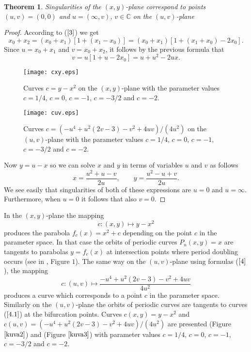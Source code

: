 \documentclass[12pt,a4paper]{amsart}
\newtheorem{lause}{Theorem}
\numberwithin{equation}{section}
\numberwithin{lause}{section}
\begin{document}
\begin{lause} \label{lause1.2}
Singularities of the $(x,y)$-plane correspond to points  $(u,v)=(0,0)$ and $u=(\infty,v)$, $v \in \mathbb{C}$ on the $(u,v)$-plane
\end{lause}
\begin{proof}
According to
($\ref{3}$) we get
\begin{displaymath}
x_{0}+x_{2}=(x_{0}+x_{1})[1+(x_{1}-x_{0})]=(x_{0}+x_{1})[1+(x_{1}+x_{0})-2x_{0}].
\end{displaymath}
Since $u=x_{0}+x_{1}$ and $v=x_{0}+x_{2}$, it follows by the previous formula that
\begin{displaymath}
v=u[1+u-2x_{0}]=u+u^{2}-2ux.
\end{displaymath}
\clearpage
\begin{figure}[h!]
\begin{center}
\texttt{[image: cxy.eps]}
\caption{Curves $c=y-x^{2}$ on the $(x,y)$-plane with the parameter values $c=1/4$, $c=0$, $c=-1$, $c=-3/2$ and $c=-2$.} \label{kuva2}
\end{center}
\end{figure}
\begin{figure}[h!]
\begin{center}
\texttt{[image: cuv.eps]}
\caption{Curves $c=(-u^{4}+u^{2}(2v-3)-v^{2}+4uv)/(4u^{2})$ on the $(u,v)$-plane with the parameter values $c=1/4$, $c=0$, $c=-1$, $c=-3/2$ and $c=-2$.} \label{kuva3}
\end{center}
\end{figure}
\clearpage
Now $y=u-x$ so we can solve $x$ and $y$ in terms of variables $u$
and $v$ as follows
\begin{equation}
 x=\frac{u^{2}+u-v}{2u},\qquad y=\frac{u^{2}-u+v}{2u}.\label{4}
 \end{equation}
 We see easily that singularities of both of these expressions are $u=0$ and
$u=\infty$. Furthermore, when $u=0$ it follows that also $v=0$.
\end{proof}
In the $(x,y)$-plane the mapping
\begin{equation}
c:(x,y)\mapsto y-x^{2} \label{4.0}
\end{equation}
produces the parabola  $f_{c}(x)=x^{2}+c$ depending on the point $c$ in the parameter space. In that case the orbits of periodic curves $P_{n}(x,y)=x$ are tangents to parabolas $y=f_{c}(x)$ at intersection points where period doubling occurs (see in \cite{1}, Figure $1$).
The same way on the $(u,v)$-plane using formulas ($\ref{4}$), the mapping
 \begin{equation}
c:(u,v)\mapsto \frac{-u^{4}+u^{2}(2v-3)-v^{2}+4uv}{4u^{2}} \label{4.1}
\end{equation}
produces a curve which corresponds to a point $c$ in the parameter space. Similarly on the $(u,v)$-plane the orbits of periodic curves are tangents to curves ($\ref{4.1}$) at the bifurcation points. Curves $c(x,y)=y-x^{2}$ and $c(u,v)=(-u^{4}+u^{2}(2v-3)-v^{2}+4uv)/(4u^{2})$ are presented (Figure $\ref{kuva2}$) and (Figure $\ref{kuva3}$) with parameter values $c=1/4$, $c=0$, $c=-1$, $c=-3/2$ and $c=-2$.
\end{document}
